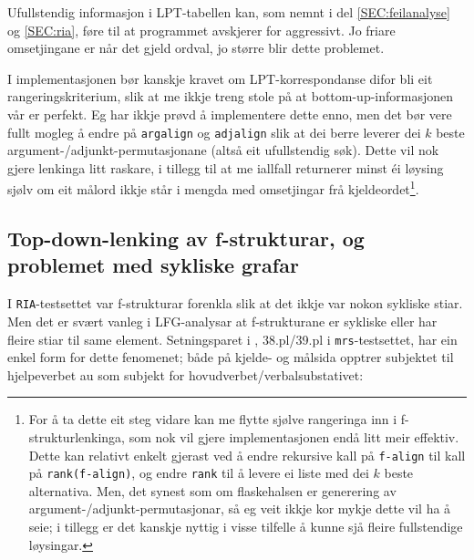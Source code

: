 \documentclass[12pt,a4paper,oneside,draft]{report}
\begin{document}
Ufullstendig informasjon i LPT-tabellen kan, som nemnt i del
 \ref{SEC:feilanalyse} og \ref{SEC:ria}, føre til at programmet
 avskjerer for aggressivt. Jo friare omsetjingane er når det gjeld
 ordval, jo større blir dette problemet.

I implementasjonen bør kanskje kravet om LPT\hyp{}korrespondanse difor bli
 eit rangeringskriterium, slik at me ikkje treng stole på at
 bottom-up-informasjonen vår er perfekt. Eg har ikkje prøvd å
 implementere dette enno, men det bør vere fullt mogleg å endre på
 \texttt{argalign} og \texttt{adjalign} slik at dei berre leverer dei $k$ beste
 argument-/adjunkt-permutasjonane (altså eit ufullstendig søk). Dette
 vil nok gjere lenkinga litt raskare, i tillegg til at me iallfall
 returnerer minst éi løysing sjølv om eit målord ikkje står i mengda
 med omsetjingar frå kjeldeordet\footnote{For å ta dette eit steg vidare kan me flytte sjølve rangeringa
        inn i f\hyp{}strukturlenkinga, som nok vil gjere implementasjonen
        endå litt meir effektiv. Dette kan relativt enkelt gjerast ved
        å endre rekursive kall på \texttt{f-align} til kall på
        \texttt{rank(f-align)}, og endre \texttt{rank} til å levere ei liste med dei
        $k$ beste alternativa. Men, det synest som om flaskehalsen er
        generering av argument-/adjunkt-permutasjonar, så eg veit
        ikkje kor mykje dette vil ha å seie; i tillegg er det kanskje
        nyttig i visse tilfelle å kunne sjå fleire fullstendige
        løysingar. }.




\subsection{Top-down-lenking av f\hyp{}strukturar, og problemet med sykliske grafar}
\label{sec-5.4.2}

    \label{SEC:reentrancy}

I \texttt{RIA}-testsettet var f\hyp{}strukturar forenkla slik at det ikkje var
nokon sykliske stiar. Men det er svært vanleg i LFG-analysar at
f\hyp{}strukturane er sykliske eller har fleire stiar til same
element. Setningsparet i \Next, 38.pl/39.pl i \texttt{mrs}-testsettet, har
ein enkel form for dette fenomenet; både på kjelde- og målsida opptrer
subjektet til hjelpeverbet au som subjekt for
hovudverbet/verbalsubstativet:
\end{document}

